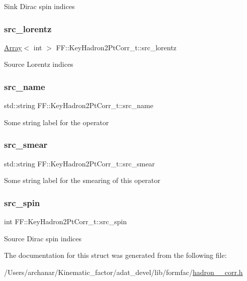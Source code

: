 Sink Dirac spin indices \mbox{\label{structFF_1_1KeyHadron2PtCorr__t_acddd5d0d6ec97de524d479b1edb16a14}} 
\subsubsection{\texorpdfstring{src\_lorentz}{src\_lorentz}}
{\footnotesize\ttfamily \mbox{\hyperlink{classXMLArray_1_1Array}{Array}}$<$ int $>$ F\+F\+::\+Key\+Hadron2\+Pt\+Corr\+\_\+t\+::src\+\_\+lorentz}

Source Lorentz indices \mbox{\label{structFF_1_1KeyHadron2PtCorr__t_a5d1d30144384ebdfc82e725835245bed}} 
\subsubsection{\texorpdfstring{src\_name}{src\_name}}
{\footnotesize\ttfamily std\+::string F\+F\+::\+Key\+Hadron2\+Pt\+Corr\+\_\+t\+::src\+\_\+name}

Some string label for the operator \mbox{\label{structFF_1_1KeyHadron2PtCorr__t_a1737b7df94def3fddeaa347d8374f91a}} 
\subsubsection{\texorpdfstring{src\_smear}{src\_smear}}
{\footnotesize\ttfamily std\+::string F\+F\+::\+Key\+Hadron2\+Pt\+Corr\+\_\+t\+::src\+\_\+smear}

Some string label for the smearing of this operator \mbox{\label{structFF_1_1KeyHadron2PtCorr__t_a1342253cc1dd2982124bf3e04e478ff6}} 
\subsubsection{\texorpdfstring{src\_spin}{src\_spin}}
{\footnotesize\ttfamily int F\+F\+::\+Key\+Hadron2\+Pt\+Corr\+\_\+t\+::src\+\_\+spin}

Source Dirac spin indices 

The documentation for this struct was generated from the following file\+:\begin{DoxyCompactItemize}
\item 
/\+Users/archanar/\+Kinematic\+\_\+factor/adat\+\_\+devel/lib/formfac/\mbox{\hyperlink{lib_2formfac_2hadron__2pt__corr_8h}{hadron\+\_\+2pt\+\_\+corr.\+h}}\end{DoxyCompactItemize}
